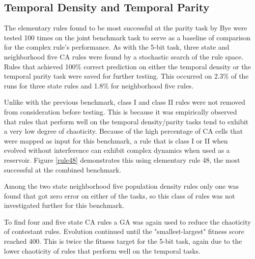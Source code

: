 \documentclass{elsarticle}
\begin{document}
\begin{multicols}{2}
	\subsection{Temporal Density and Temporal Parity}
	The elementary rules found to be most successful at the parity task by Bye 
	were tested 100 times on the joint benchmark task to serve as a baseline 
	of comparison for the complex rule's performance. As with the 5-bit task, 
	three state and neighborhood five CA rules were found by a stochastic 
	search of the rule space. Rules that achieved 100\% correct 
	prediction on either the temporal density or the temporal parity 
	task were saved for further testing. This occurred on 2.3\% of the 
	runs for three state rules and 1.8\% for neighborhood five rules.  
	\par  Unlike with the previous benchmark, class I and class II rules 
	were not removed from consideration before testing.  This is because 
	it was empirically observed that rules that perform well on the 
	temporal density/parity tasks tend to exhibit a very low degree of 
	chaoticity. Because of the high percentage of CA cells that were 
	mapped as input for this benchmark, a rule that is class I or II 
	when evolved without interference can exhibit complex dynamics when 
	used as a reservoir.  Figure \ref{rule48} demonstrates this using 
	elementary rule 48, the most successful at the combined benchmark.  
	\par Among the two state neighborhood five population density rules 
	only one was found that got zero error on either of the tasks, so 
	this class of rules was not investigated further for this benchmark.  
	\par To find four and five state CA rules a GA was again used to 
	reduce the chaoticity of contestant rules. Evolution continued until 
	the "smallest-largest" fitness score reached 400. This is twice the 
	fitness target for the 5-bit task, again due to the lower chaoticity 
	of rules that perform well on the temporal tasks.
	
	

\end{multicols}
\end{document}
